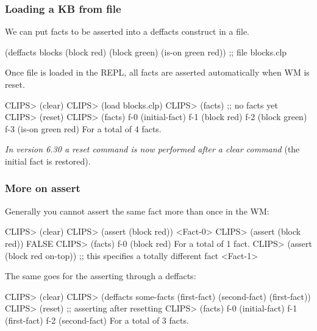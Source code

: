 \documentclass[xcolor={usenames,dvipsnames,svgnames}, compress]{beamer}
\begin{document}
\begin{frame}[fragile]
  \frametitle{Loading a KB from file}
  We can put facts to be asserted into a \textsf{deffacts} construct
  in a file.
  \begin{clips-code}[numbers=none]
    (deffacts blocks
        (block red) (block green) (is-on green red))
    ;; file blocks.clp    
      \end{clips-code}
  Once file is \textsf{loaded} in the REPL, all facts are
  asserted automatically when WM is \textsf{reset}.\par
  \begin{clips-code}
    CLIPS> (clear)
    CLIPS> (load blocks.clp)
    CLIPS> (facts) ;; no facts yet
    CLIPS> (reset)
    CLIPS> (facts)
    f-0     (initial-fact)
    f-1     (block red)
    f-2     (block green)
    f-3     (is-on green red)
    For a total of 4 facts.
  \end{clips-code}
  \emph{In version 6.30 a reset command is now performed after a clear
    command} (the initial fact is restored).\par\bigskip 
\end{frame}

\begin{frame}[fragile]
  \frametitle{More on assert}
  Generally you cannot assert the same fact more than once in the WM:
  \begin{clips-code}
    CLIPS> (clear)
    CLIPS> (assert (block red))
    <Fact-0>
    CLIPS> (assert (block red))
    FALSE
    CLIPS> (facts)
    f-0     (block red)
    For a total of 1 fact.
    CLIPS> (assert (block red on-top)) ;; this specifies a totally different fact
    <Fact-1>
  \end{clips-code}
  The same goes for the asserting through a \textsf{deffacts}:
  \begin{clips-code}
    CLIPS> (clear)
    CLIPS> (deffacts some-facts (first-fact) (second-fact) (first-fact))
    CLIPS> (reset) ;; asserting after resetting
    CLIPS> (facts)
    f-0     (initial-fact)
    f-1     (first-fact)
    f-2     (second-fact)
    For a total of 3 facts.
  \end{clips-code}
\end{frame}
\end{document}
